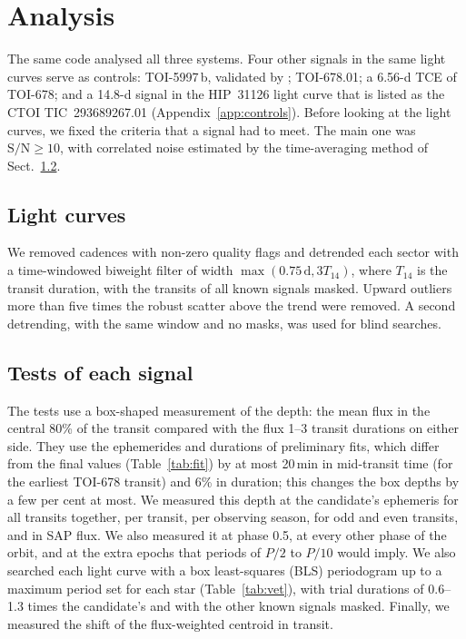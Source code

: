 \documentclass[twocolumn,numberedappendix,appendixfloats]{openjournal}
\begin{document}
\section{Analysis}
\label{sec:methods}

The same code analysed all three systems. Four other signals in the same light
curves serve as controls: TOI-5997\,b, validated by \citet{collier2026};
TOI-678.01; a 6.56-d TCE of TOI-678; and a 14.8-d signal in the HIP~31126 light
curve that is listed as the CTOI TIC~293689267.01 (Appendix~\ref{app:controls}).
Before looking at the light curves, we fixed the criteria that a signal had to
meet. The main one was $\mathrm{S/N} \ge 10$, with correlated noise estimated by
the time-averaging method of Sect.~\ref{sec:vet}.

\subsection{Light curves}
\label{sec:lc}

We removed cadences with non-zero quality flags and detrended each sector with
a time-windowed biweight filter \citep{hippke2019} of width
$\max(0.75\,\mathrm{d}, 3T_{14})$, where $T_{14}$ is the transit duration,
with the transits of all known signals masked. Upward outliers more than five
times the robust scatter above the trend were removed. A second detrending,
with the same window and no masks, was used for blind searches.

\subsection{Tests of each signal}
\label{sec:vet}

The tests use a box-shaped measurement of the depth: the mean flux in the
central 80\% of the transit compared with the flux 1--3 transit durations on
either side. They use the ephemerides and durations of preliminary fits, which
differ from the final values (Table~\ref{tab:fit}) by at most 20\,min in
mid-transit time (for the earliest TOI-678 transit) and 6\% in duration; this
changes the box depths by a few per cent at most. We measured this depth at the candidate's ephemeris for all transits
together, per transit, per observing season, for odd and even transits, and in
SAP flux. We also measured it at phase 0.5, at every other phase of the orbit,
and at the extra epochs that periods of $P/2$ to $P/10$ would imply. We also searched each light curve with a box least-squares (BLS) periodogram
\citep{kovacs2002} up to a maximum period set for each star (Table~\ref{tab:vet}),
with trial durations of 0.6--1.3 times the candidate's and with the other known
signals masked. Finally, we measured the shift of the flux-weighted centroid in
transit.
\end{document}
